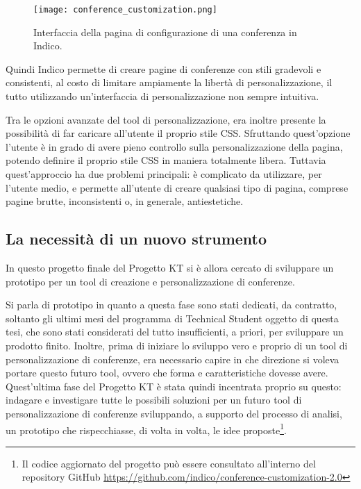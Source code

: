         \begin{figure}[h!]
            \begin{center}
        		\texttt{[image: conference\_customization.png]}
        	\end{center}
            \caption[Tool di configurazione di una conferenza in Indico]{Interfaccia della pagina di configurazione di una conferenza in Indico.}
            \label{fig:conference_customization}
        \end{figure}
        
        Quindi Indico permette di creare pagine di conferenze con stili gradevoli e consistenti, al costo di limitare ampiamente la libertà di personalizzazione, il tutto utilizzando un'interfaccia di personalizzazione non sempre intuitiva.
        
        Tra le opzioni avanzate del tool di personalizzazione, era inoltre presente la possibilità di far caricare all'utente il proprio stile \ac{CSS}. Sfruttando quest'opzione l'utente è in grado di avere pieno controllo sulla personalizzazione della pagina, potendo definire il proprio stile \ac{CSS} in maniera totalmente libera. Tuttavia quest'approccio ha due problemi principali: è complicato da utilizzare, per l'utente medio, e permette all'utente di creare qualsiasi tipo di pagina, comprese pagine brutte, inconsistenti o, in generale, antiestetiche.
        
        \subsection{La necessità di un nuovo strumento} \label{subsec:ccp;sa;necessità_nuovo_strumento}
        
            In questo progetto finale del Progetto KT si è allora cercato di sviluppare un prototipo per un tool di creazione e personalizzazione di conferenze.
            
            Si parla di prototipo in quanto a questa fase sono stati dedicati, da contratto, soltanto gli ultimi mesi del programma di Technical Student oggetto di questa tesi, che sono stati considerati del tutto insufficienti, a priori, per sviluppare un prodotto finito. Inoltre, prima di iniziare lo sviluppo vero e proprio di un tool di personalizzazione di conferenze, era necessario capire in che direzione si voleva portare questo futuro tool, ovvero che forma e caratteristiche dovesse avere. Quest'ultima fase del Progetto KT è stata quindi incentrata proprio su questo: indagare e investigare tutte le possibili soluzioni per un futuro tool di personalizzazione di conferenze sviluppando, a supporto del processo di analisi, un prototipo che rispecchiasse, di volta in volta, le idee proposte\footnote{Il codice aggiornato del progetto può essere consultato all'interno del repository GitHub \url{https://github.com/indico/conference-customization-2.0}}.
            
